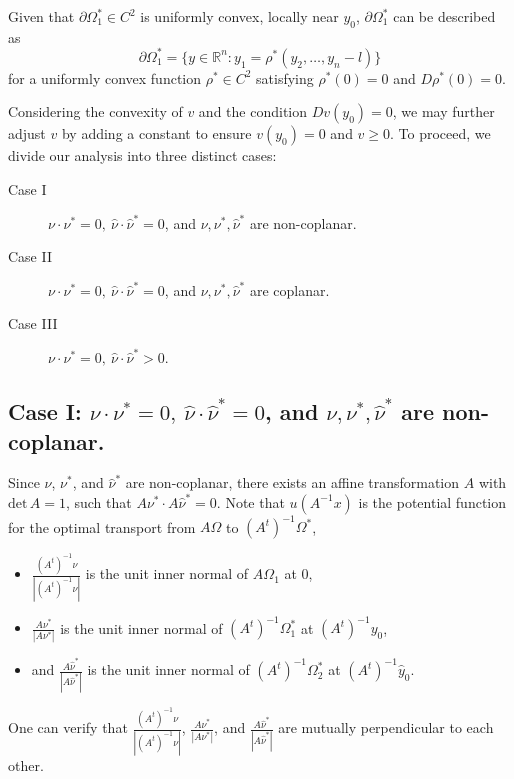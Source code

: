 \documentclass[11pt]{amsart}
\theoremstyle{plain}
\renewcommand{\det}{\mbox{det}}
\newcommand{\0}{\textbf{0}}
\numberwithin{equation}{section}
\numberwithin{equation}{section}
\numberwithin{figure}{section}
\begin{document}
Given that \( \partial\Omega^*_1 \in C^2 \) is uniformly convex, locally near \( y_0 \), \( \partial\Omega^*_1 \) can be described as
  \begin{equation}\label{ostar1}
  \partial\Omega^*_1 = \{y\in\mathbb{R}^n : y_1 = \rho^*(y_2, \ldots, y_n-l)\}
  \end{equation}
for a uniformly convex function \( \rho^* \in C^2 \) satisfying $\rho^*(0)=0$ and $D\rho^*(0)=0$.


 

Considering the convexity of \( v \) and the condition \( Dv(y_0) = 0 \), we may further adjust \( v \) by adding a constant to ensure \( v(y_0) = 0 \) and \( v \geq 0 \).
To proceed, we divide our analysis into three distinct cases:


\begin{description}
    \item[Case I]  $\nu\cdot \nu^*=0,\ \hat\nu \cdot \hat\nu^* = 0$, and $\nu, \nu^*, \hat{\nu}^*$ are non-coplanar.
    \item[Case II] $\nu\cdot \nu^*=0,\ \hat\nu \cdot \hat\nu^* = 0$, and $\nu, \nu^*, \hat\nu^*$ are coplanar.
 \item[Case III]  $\nu\cdot \nu^*=0,\ \hat\nu \cdot \hat\nu^* > 0$.
\end{description}


\subsection{Case I:  $\nu\cdot \nu^*=0,\ \hat\nu \cdot \hat\nu^* = 0$, and $\nu, \nu^*, \hat{\nu}^*$ are non-coplanar.}

Since \( \nu \), \( \nu^* \), and \( \hat{\nu}^* \) are non-coplanar, there exists an affine transformation \( A \) with \( \det\,A = 1 \), such that \( A\nu^* \cdot A\hat{\nu}^* =0 \). Note that \( u(A^{-1}x) \) is the potential function for the optimal transport from \( A\Omega \) to \( (A^t)^{-1}\Omega^* \), 
\begin{itemize}
\item \( \frac{(A^t)^{-1}\nu}{|(A^t)^{-1}\nu|} \) is the unit inner normal of \( A\Omega_1 \) at \( 0 \), 
\item \( \frac{A\nu^*}{|A\nu^*|} \) is the unit inner normal of \( (A^t)^{-1}\Omega_1^* \) at \( (A^t)^{-1}y_0 \), 
\item and \( \frac{A\hat{\nu}^*}{|A\hat{\nu}^*|} \) is the unit inner normal of \( (A^t)^{-1}\Omega_2^* \) at \(  (A^t)^{-1}\hat{y}_0 \). 
\end{itemize}
One can verify that \( \frac{(A^t)^{-1}\nu}{|(A^t)^{-1}\nu|} \), \( \frac{A\nu^*}{|A\nu^*|} \), and \( \frac{A\hat{\nu}^*}{|A\hat{\nu}^*|} \) are mutually perpendicular to each other.
\end{document}
